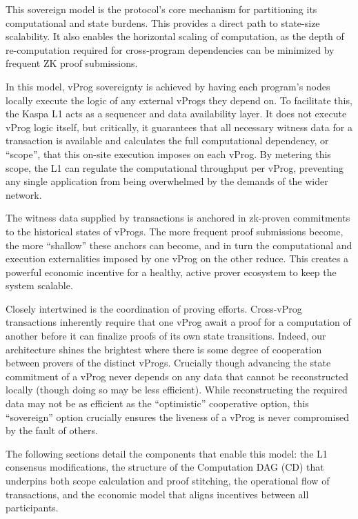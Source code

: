 \documentclass[onecolumn, 9pt, a4paper]{extarticle}
\begin{document}
This sovereign model is the protocol's core mechanism for partitioning its computational and state burdens. This provides a direct path to state-size scalability. It also enables the horizontal scaling of computation, as the depth of re-computation required for cross-program dependencies can be minimized by frequent ZK proof submissions.

In this model, vProg sovereignty is achieved by having each program's nodes locally execute the logic of any external vProgs they depend on. To facilitate this, the Kaspa L1 acts as a sequencer and data availability layer. It does not execute vProg logic itself, but critically, it guarantees that all necessary witness data for a transaction is available and calculates the full computational dependency, or ``scope'', that this on-site execution imposes on each vProg. By metering this scope, the L1 can regulate the computational throughput per vProg, preventing any single application from being overwhelmed by the demands of the wider network. 

The witness data supplied by transactions is anchored in zk-proven commitments to the historical states of vProgs. The more frequent proof submissions become, the more ``shallow'' these anchors can become, and in turn the computational and execution externalities imposed by one vProg on the other reduce. This creates a powerful economic incentive for a healthy, active prover ecosystem to keep the system scalable.

Closely intertwined is the coordination of proving efforts. Cross-vProg transactions inherently require that one vProg await a proof for a computation of another before it can finalize proofs of its own state transitions. Indeed, our architecture shines the brightest where there is some degree of cooperation between provers of the distinct vProgs. Crucially though advancing the state commitment of a vProg never depends on any data that cannot be reconstructed locally (though doing so may be less efficient). While reconstructing the required data may not be as efficient as the ``optimistic'' cooperative option, this ``sovereign'' option crucially ensures the liveness of a vProg is never compromised by the fault of others.

The following sections detail the components that enable this model: the L1 consensus modifications, the structure of the Computation DAG (CD) that underpins both scope calculation and proof stitching, the operational flow of transactions, and the economic model that aligns incentives between all participants.
\end{document}
